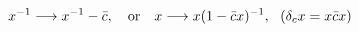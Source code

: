 \begin{equation}
x^{-1} \longrightarrow x^{-1}- \bar{c}, ~~~{\rm or}~~~x \longrightarrow x(1-\bar{c} x)^{-1},~~
(\delta_{c} x = x \bar{c} x)    \label{53}
\end{equation}

